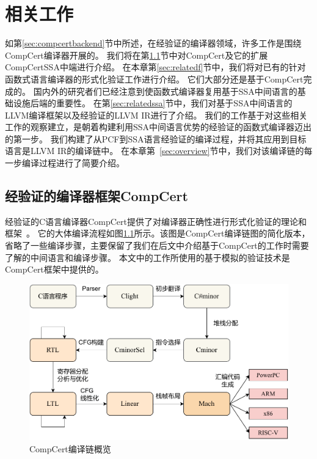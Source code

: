 
\chapter{相关工作} \label{ch:related}

如第\ref{sec:compcertbackend}节中所述，在经验证的编译器领域，许多工作是围绕CompCert编译器开展的。
我们将在第\ref{sec:relatedc}节中对CompCert及它的扩展CompCertSSA中端进行介绍。
在本章第\ref{sec:relatedf}节中，我们将对已有的针对函数式语言编译器的形式化验证工作进行介绍。
它们大部分还是基于CompCert完成的。 
国内外的研究者们已经注意到使函数式编译器复用基于SSA中间语言的基础设施后端的重要性。
在第\ref{sec:relatedssa}节中，我们对基于SSA中间语言的LLVM编译框架以及经验证的LLVM IR进行了介绍。
我们的工作基于对这些相关工作的观察建立，是朝着构建利用SSA中间语言优势的经验证的函数式编译器迈出的第一步。
我们构建了从PCF到SSA语言经验证的编译过程，并将其应用到目标语言是LLVM IR的编译链中。
在本章第~\ref{sec:overview}节中，我们对该编译链的每一步编译过程进行了简要介绍。

\section{经验证的编译器框架CompCert} \label{sec:relatedc}

经验证的C语言编译器CompCert提供了对编译器正确性进行形式化验证的理论和框架~\cite{leroy2009formally}。
它的大体编译流程如图\ref{fig:compcert}所示。该图是CompCert编译链图的简化版本，
省略了一些编译步骤，主要保留了我们在后文中介绍基于CompCert的工作时需要了解的中间语言和编译步骤。
本文中的工作所使用的基于模拟的验证技术是CompCert框架中提供的。
\begin{figure}[htbp]
    \centering
    \vspace{3ex}
    \includegraphics[width=0.8\linewidth]{figures/compcert.pdf}
    \caption{CompCert编译链概览}\label{fig:compcert}
\end{figure}

